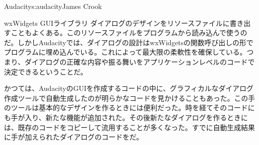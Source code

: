 \begin{aosachapter}{Audacity}{s:audacity}{James Crook}
\begin{aosasect1}{wxWidgets GUIライブラリ}
ダイアログのデザインをリソースファイルに書き出すこともよくある。このリソースファイルをプログラムから読み込んで使うのだ。しかしAudacityでは、ダイアログの設計はwxWidgetsの関数呼び出しの形でプログラムに埋め込んでいる。これによって最大限の柔軟性を確保している。つまり、ダイアログの正確な内容や振る舞いをアプリケーションレベルのコードで決定できるということだ。

かつては、AudacityのGUIを作成するコードの中に、グラフィカルなダイアログ作成ツールで自動生成したのが明らかなコードを見かけることもあった。この手のツールは基本的なデザインを作るときには便利だった。時を経てそのコードにも手が入り、新たな機能が追加された。その後新たなダイアログを作るときには、既存のコードをコピーして流用することが多くなった。すでに自動生成結果に手が加えられたダイアログのコードをだ。


\end{aosasect1}
\end{aosachapter}
